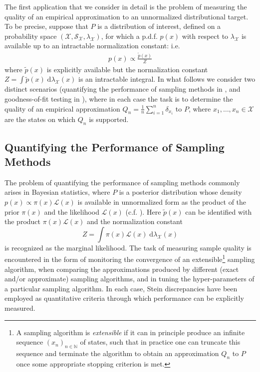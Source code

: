 \documentclass[12pt,paper=letter]{scrreprt}
\begin{document}
The first application that we consider in detail is the problem of measuring the quality of an empirical approximation to an unnormalized distributional target.
To be precise, suppose that $P$ is a distribution of interest, defined on a probability space $(\mathcal{X},\mathcal{S}_{\mathcal{X}},\lambda_{\mathcal{X}})$, for which a p.d.f. $p(x)$ with respect to $\lambda_{\mathcal{X}}$ is available up to an intractable normalization constant:  i.e.
\begin{align*}
    p(x) \propto \frac{\tilde{p}(x)}{Z}
\end{align*}
where $\tilde{p}(x)$ is explicitly available but the normalization constant $Z = \int \tilde{p}(x) \; \mathrm{d}\lambda_{\mathcal{X}}(x)$ is an intractable integral.
In what follows we consider two distinct scenarios (quantifying the performance of sampling methods in , and goodness-of-fit testing in ), where in each case the task is to determine the quality of an empirical approximation $Q_n = \frac{1}{n} \sum_{i=1}^n \delta_{x_i}$ to $P$, where $x_1,\dots,x_n \in \mathcal{X}$ are the states on which $Q_n$ is supported.



\subsection{Quantifying the Performance of Sampling Methods}
\label{subsec: app to Bayes}

The problem of quantifying the performance of sampling methods commonly arises in Bayesian statistics, where $P$ is a posterior distribution whose density $p(x) \propto \pi(x) \mathcal{L}(x)$ is available in unnormalized form as the product of the prior $\pi(x)$ and the likelihood $\mathcal{L}(x)$ (c.f. ).
Here $\tilde{p}(x)$ can be identified with the product $\pi(x) \mathcal{L}(x)$ and the normalization constant
$$
Z = \int \pi(x) \mathcal{L}(x) \; \mathrm{d}\lambda_{\mathcal{X}}(x)
$$
is recognized as the marginal likelihood.
The task of measuring sample quality is encountered in the form of monitoring the convergence of an extensible\footnote{A sampling algorithm is \emph{extensible} if it can in principle produce an infinite sequence $(x_n)_{n \in \mathbb{N}}$ of states, such that in practice one can truncate this sequence and terminate the algorithm to obtain an approximation $Q_n$ to $P$ once some appropriate stopping criterion is met. } sampling algorithm, when comparing the approximations produced by different (exact and/or approximate) sampling algorithms, and in tuning the hyper-parameters of a particular sampling algorithm.
In each case, Stein discrepancies have been employed as quantitative criteria through which performance can be explicitly measured.
\end{document}
